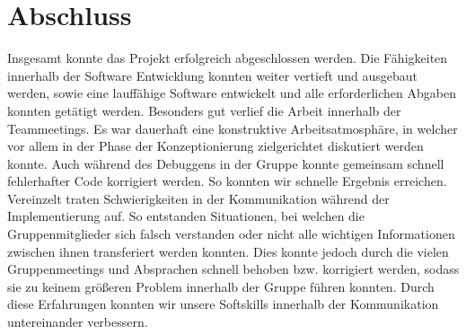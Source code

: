 \documentclass[conference]{IEEEtran}
\begin{document}
\section{Abschluss}
Insgesamt konnte das Projekt erfolgreich abgeschlossen werden. Die Fähigkeiten innerhalb der Software Entwicklung konnten weiter vertieft und ausgebaut werden, sowie eine lauffähige Software entwickelt und alle erforderlichen Abgaben konnten getätigt werden.
Besonders gut verlief die Arbeit innerhalb der Teammeetings. Es war dauerhaft eine konstruktive Arbeitsatmosphäre, in welcher vor allem in der Phase der Konzeptionierung zielgerichtet diskutiert werden konnte. Auch während des Debuggens in der Gruppe konnte gemeinsam schnell fehlerhafter Code korrigiert werden. So konnten wir schnelle Ergebnis erreichen. \\
Vereinzelt traten Schwierigkeiten in der Kommunikation während der Implementierung auf. So entstanden Situationen, bei welchen die Gruppenmitglieder sich falsch verstanden oder nicht alle wichtigen Informationen zwischen ihnen transferiert werden konnten. Dies konnte jedoch durch die vielen Gruppenmeetings und Absprachen schnell behoben bzw. korrigiert werden, sodass sie zu keinem größeren Problem innerhalb der Gruppe führen konnten. Durch diese Erfahrungen konnten wir unsere Softskills innerhalb der Kommunikation untereinander verbessern.
\end{document}
